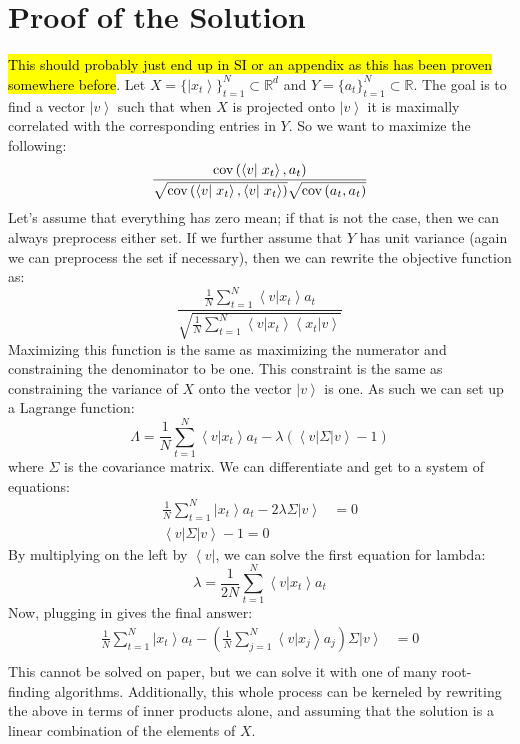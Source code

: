 \documentclass[onecolumn,floatfix,nofootinbib,aps,notitlepage]{revtex4-1}
\newcommand{\bra}[1]{\ensuremath{\left\langle#1\right|}}
\newcommand{\ket}[1]{\ensuremath{\left|#1\right\rangle}}
\newcommand{\braket}[2]{\ensuremath{\left\langle#1\right|\left.#2\right\rangle}}
\begin{document}
\section{Proof of the Solution}
\hl{This should probably just end up in SI or an appendix as this has been proven somewhere before}.
Let $X = \{\ket{x_t}\}_{t=1}^N \subset \mathbb{R}^d$ and $Y = \{a_t\}_{t=1}^N \subset \mathbb{R}$. The goal is to find a vector $\ket{v}$ such that when $X$ is projected onto $\ket{v}$ it is maximally correlated with the corresponding entries in $Y$. So we want to maximize the following:
$$ \frac{\textnormal{cov}\left(\braket{v}{x_t}, a_t\right)}{\sqrt{\textnormal{cov}\left(\braket{v}{x_t}, \braket{v}{x_t}\right)}
 \sqrt{\textnormal{cov}\left(a_t, a_t\right)}}$$ Let's assume that everything has zero mean; if that is not the case, then we can always preprocess either set. If we further assume that $Y$ has unit variance (again we can preprocess the set if necessary), then we can rewrite the objective function as:
$$ \frac{\frac{1}{N}\sum_{t=1}^N \braket{v}{x_t} a_t}
	{\sqrt{\frac{1}{N}\sum_{t=1}^N \braket{v}{x_t}\braket{x_t}{v}}}$$ Maximizing this function is the same as maximizing the numerator and constraining the denominator to be one. This constraint is the same as constraining the variance of $X$ onto the vector $\ket{v}$ is one. As such we can set up a Lagrange function:
$$ \Lambda = \frac{1}{N} \sum_{t=1}^N \braket{v}{x_t} a_t - \lambda \left(\bra{v}\Sigma\ket{v} - 1\right) $$ where $\Sigma$ is the covariance matrix. We can differentiate and get to a system of equations:
\begin{align*} 
\frac{1}{N} \sum_{t=1}^N \ket{x_t} a_t - 2 \lambda \Sigma \ket{v} &= 0 \\
\bra{v}\Sigma\ket{v} - 1 = 0 
\end{align*} By multiplying on the left by $\bra{v}$, we can solve the first equation for lambda:
$$ \lambda = \frac{1}{2N} \sum_{t=1}^N \braket{v}{x_t} a_t $$ Now, plugging in gives the final answer:
\begin{align*}
\frac{1}{N} \sum_{t=1}^N \ket{x_t}a_t - \left(\frac{1}{N}\sum_{j=1}^N \braket{v}{x_j}a_j\right) \Sigma \ket{v} &= 0\\
\end{align*} This cannot be solved on paper, but we can solve it with one of many root-finding algorithms. Additionally, this whole process can be kerneled by rewriting the above in terms of inner products alone, and assuming that the solution is a linear combination of the elements of $X$.
\end{document}

